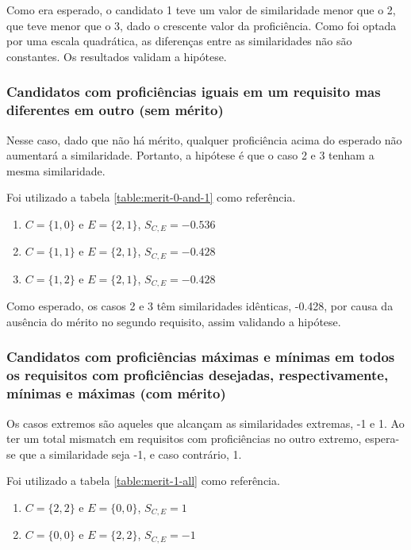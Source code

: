 \documentclass[preprint,12pt]{elsarticle}
\begin{document}
Como era esperado, o candidato 1 teve um valor de similaridade menor que o 2, que teve menor que o 3, dado o crescente valor da proficiência. Como foi optada por uma escala quadrática, as diferenças entre as similaridades não são constantes. Os resultados validam a hipótese.

\subsubsection{Candidatos com proficiências iguais em um requisito mas diferentes em outro (sem mérito)}

Nesse caso, dado que não há mérito, qualquer proficiência acima do esperado não aumentará a similaridade. Portanto, a hipótese é que o caso 2 e 3 tenham a mesma similaridade.

Foi utilizado a tabela \ref{table:merit-0-and-1} como referência.

\begin{enumerate}
    \item $C = \{1,0\}$ e $E = \{2,1\}$, $S_{C,E} = -0.536$
    \item $C = \{1,1\}$ e $E = \{2,1\}$, $S_{C,E} = -0.428$
    \item $C = \{1,2\}$ e $E = \{2,1\}$, $S_{C,E} = -0.428$
\end{enumerate}

Como esperado, os casos 2 e 3 têm similaridades idênticas, -0.428, por causa da ausência do mérito no segundo requisito, assim validando a hipótese.

\subsubsection{Candidatos com proficiências máximas e mínimas em todos os requisitos com proficiências desejadas, respectivamente, mínimas e máximas (com mérito)}

Os casos extremos são aqueles que alcançam as similaridades extremas, -1 e 1. Ao ter um total mismatch em requisitos com proficiências no outro extremo, espera-se que a similaridade seja -1, e caso contrário, 1.

Foi utilizado a tabela \ref{table:merit-1-all} como referência.

\begin{enumerate}
    \item $C = \{2,2\}$ e $E = \{0,0\}$, $S_{C,E} = 1$
    \item $C = \{0,0\}$ e $E = \{2,2\}$, $S_{C,E} = -1$
\end{enumerate}
\end{document}
